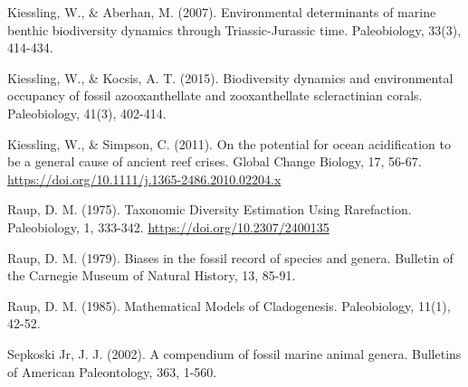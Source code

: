 \documentclass[]{article}
\begin{document}
Kiessling, W., \& Aberhan, M. (2007). Environmental determinants of
marine benthic biodiversity dynamics through Triassic-Jurassic time.
Paleobiology, 33(3), 414-434.

Kiessling, W., \& Kocsis, A. T. (2015). Biodiversity dynamics and
environmental occupancy of fossil azooxanthellate and zooxanthellate
scleractinian corals. Paleobiology, 41(3), 402-414.

Kiessling, W., \& Simpson, C. (2011). On the potential for ocean
acidification to be a general cause of ancient reef crises. Global
Change Biology, 17, 56-67.
\url{https://doi.org/10.1111/j.1365-2486.2010.02204.x}

Raup, D. M. (1975). Taxonomic Diversity Estimation Using Rarefaction.
Paleobiology, 1, 333-342. \url{https://doi.org/10.2307/2400135}

Raup, D. M. (1979). Biases in the fossil record of species and genera.
Bulletin of the Carnegie Museum of Natural History, 13, 85-91.

Raup, D. M. (1985). Mathematical Models of Cladogenesis. Paleobiology,
11(1), 42-52.

Sepkoski Jr, J. J. (2002). A compendium of fossil marine animal genera.
Bulletins of American Paleontology, 363, 1-560.
\end{document}
